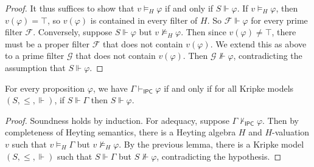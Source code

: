 \begin{proof}
    It thus suffices to show that \( v \vDash_H \varphi \) if and only if \( S \Vdash \varphi \).
    If \( v \vDash_H \varphi \), then \( v(\varphi) = \top \), so \( v(\varphi) \) is contained in every filter of \( H \).
    So \( \mathcal F \Vdash \varphi \) for every prime filter \( \mathcal F \).
    Conversely, suppose \( S \Vdash \varphi \) but \( v \nvDash_H \varphi \).
    Then since \( v(\varphi) \neq \top \), there must be a proper filter \( \mathcal F \) that does not contain \( v(\varphi) \).
    We extend this as above to a prime filter \( \mathcal G \) that does not contain \( v(\varphi) \).
    Then \( \mathcal G \nVdash \varphi \), contradicting the assumption that \( S \Vdash \varphi \).
\end{proof}
\begin{theorem}[completeness]
    For every proposition \( \varphi \), we have \( \Gamma \vdash_{\mathsf{IPC}} \varphi \) if and only if for all Kripke models \( (S, \leq, \Vdash) \), if \( S \Vdash \Gamma \) then \( S \Vdash \varphi \).
\end{theorem}
\begin{proof}
    Soundness holds by induction.
    For adequacy, suppose \( \Gamma \nvdash_{\mathsf{IPC}} \varphi \).
    Then by completeness of Heyting semantics, there is a Heyting algebra \( H \) and \( H \)-valuation \( v \) such that \( v \vDash_H \Gamma \) but \( v \nvDash_H \varphi \).
    By the previous lemma, there is a Kripke model \( (S, \leq, \Vdash) \) such that \( S \Vdash \Gamma \) but \( S \nVdash \varphi \), contradicting the hypothesis.
\end{proof}
